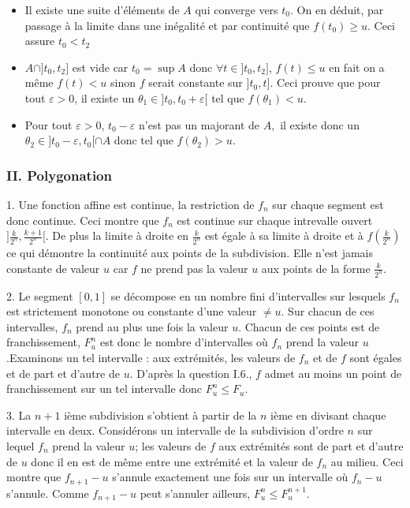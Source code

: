 \begin{itemize}
\item  Il existe une suite d'{\'e}l{\'e}ments de $A$ qui converge vers $%
t_{0}.$ On en d{\'e}duit, par passage {\`a} la limite dans une
in{\'e}galit{\'e} et par continuit{\'e} que $f(t_{0})\geq u$. Ceci assure $%
t_{0}<t_{2}$

\item  $A\cap ] t_{0},t_{2}] $ est vide car $t_{0}=\sup A$ donc $%
\forall t\in ] t_{0},t_{2}] $, $f(t)\leq u$ en fait on a m{\^e}me
$f(t)<u$ sinon $f$ serait constante sur $] t_{0},t] $. Ceci prouve
que pour tout $\varepsilon >0$, il existe un $\theta _{1}\in ]
t_{0},t_{0}+\varepsilon [ $ tel que $f(\theta _{1})<u$.

\item  Pour tout $\varepsilon >0$, $t_{0}-\varepsilon $ n'est pas un
majorant de $A,$ il existe donc un $\theta _{2}\in ]
t_{0}-\varepsilon ,t_{0}[ \cap A$ donc tel que $f(\theta _{2})>u$.
\end{itemize}

\subsubsection*{II. Polygonation}

1.  Une fonction affine est continue, la restriction de $f_{n}$
sur chaque segment est donc continue. Ceci montre que $f_{n}$ est
continue sur chaque intrevalle ouvert $]
\frac{k}{2^{n}},\frac{k+1}{2^{n}}[ $. De plus la limite {\`a}
droite en $\frac{k}{2^{n}}$ est {\'e}gale {\`a} sa limite {\`a}
droite et {\`a} $f(\frac{k}{2^{n}})$ ce qui d{\'e}montre la
continuit{\'e} aux points de la subdivision. Elle n'est jamais
constante de
valeur $u$ car $f$ ne prend pas la valeur $u$ aux points de la forme $\frac{k%
}{2^{n}}$.

2.  Le segment $[ 0,1] $ se d{\'e}compose en un nombre fini
d'intervalles sur lesquels $f_{n}$ est strictement monotone ou
constante d'une valeur $\neq u$. Sur chacun de ces intervalles,
$f_{n}$ prend au plus
une fois la valeur $u$. Chacun de ces points est de franchissement, $%
F_{u}^{n}$ est donc le nombre d'intervalles o{\`u} $f_{n}$ prend la
valeur $u $.\newline Examinons un tel intervalle : aux extr{\'e}mit{\'e}s,
les valeurs de $f_{n}$ et de $f$ sont {\'e}gales et de part et d'autre
de $u$. D'apr{\`e}s la question I.6., $f$ admet au moins un point de
franchissement sur un tel intervalle donc $F_{u}^{n}\leq F_{u}$.

3.  La $n+1$ i{\`e}me subdivision s'obtient {\`a} partir de la $n$
i{\`e}me en divisant chaque intervalle en deux. Consid{\'e}rons un
intervalle de la subdivision d'ordre $n$ sur lequel $f_{n}$ prend la valeur $%
u$; les valeurs de $f$ aux extr{\'e}mit{\'e}s sont de part et d'autre de
$u$ donc il en est de m{\^e}me entre une extr{\'e}mit{\'e} et la valeur de
$f_{n} $ au milieu. Ceci montre que $f_{n+1}-u$ s'annule
exactement une fois sur un intervalle o{\`u} $f_{n}-u$ s'annule. Comme
$f_{n+1}-u$ peut s'annuler ailleurs, $F_{u}^{n}\leq F_{u}^{n+1}$.

